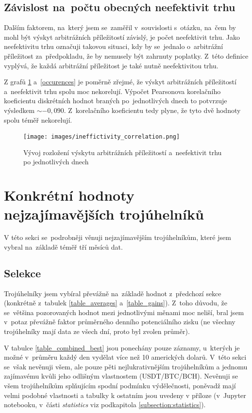 \documentclass[thesis=B,czech]{FITthesis}[2019/03/21]
\begin{document}
\subsection{Závislost na~počtu obecných neefektivit trhu}
Dalším faktorem, na~který jsem se~zaměřil v~souvislosti s~otázku, na~čem by mohl být výskyt arbitrážních příležitostí závislý, je počet neefektivit trhu. Jako neefektivitu trhu označuji takovou situaci, kdy by se~jednalo o~arbitrážní příležitost za~předpokladu, že by nemusely být zahrnuty poplatky. Z~této definice vyplývá, že každá arbitrážní příležitost je také nutně neefektivitou trhu.

Z grafů \ref{ineffictivity_correlation} a~\ref{occurences} je poměrně zřejmé, že výskyt arbitrážních příležitostí a~neefektivit trhu spolu moc nekorelují. Výpočet Pearsonova korelačního koeficientu diskrétních hodnot braných po~jednotlivých dnech to potvrzuje výsledkem \(\sim-0,090\). Z~korelačního koeficientu tedy plyne, že tyto dvě hodnoty spolu téměř nekorelují.

\begin{figure}\centering
	\texttt{[image: images/ineffictivity\_correlation.png]}
	\caption{Vývoj rozložení výskytu arbitrážních příležitostí a~neefektivit trhu po jednotlivých dnech}
	\label{ineffictivity_correlation}
\end{figure}

\section{Konkrétní hodnoty nejzajímavějších trojúhelníků}
V této sekci se~podrobněji věnuji nejzajímavějším trojúhelníkům, které jsem vybral na~základě téměř tří měsíců dat. 

\subsection{Selekce}
Trojúhelníky jsem vybíral převážně na~základě hodnot z~předchozí sekce \linebreak (konkrétně z~tabulek \ref{table_averages} a~\ref{table_gains}). Z~toho důvodu, že se~většina pozorovaných hodnot mezi jednotlivými měnami moc neliší, bral jsem v~potaz převážně faktor průměrného denního potenciálního zisku (ne všechny trojúhelníky mají data ze všech dní, proto byl zvolen průměr).

V tabulce \ref{table_combined_best} jsou ponechány pouze záznamy, u~kterých je možné v~průměru každý den vydělat více než 10 amerických dolarů. V~této sekci se~však nevěnuji všem, ale pouze pěti nejlukrativnějším trojúhelníkům a jednomu zajímavému kvůli jeho odlišným vlastnostem (USDT/BTC/BCH). Nevěnuji se všem trojúhelníkům splňujícím spodní podmínku výdělečnosti, poněvadž mají velmi podobné vlastnosti a tabulky k ostatním jsou uvedeny v příloze (v~Jupyter notebooku, v~části \textit{statistics} viz podkapitola \ref{subsection:statistics}).
\end{document}
